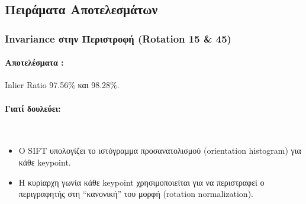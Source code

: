 \documentclass[12pt]{article}
\begin{document}
\subsection{Πειράματα Αποτελεσμάτων}
\begin{table}[h!]
  \centering
  \caption{Αποτελέσματα δοκιμών αντιστοίχισης keypoints με RANSAC}
  \end{table}


\subsubsection{Invariance στην Περιστροφή (Rotation 15\textdegree{} \& 45\textdegree{})}  
\paragraph{Αποτελέσματα : }Inlier Ratio 97.56\% και 98.28\%.
\mbox{}\\
\paragraph{Γιατί δουλεύει:}
\mbox{}\\
\begin{itemize}
  \item Ο SIFT υπολογίζει το ιστόγραμμα προσανατολισμού (orientation histogram) για κάθε keypoint.
  \item Η κυρίαρχη γωνία κάθε keypoint χρησιμοποιείται για να περιστραφεί ο περιγραφητής στη “κανονική” του μορφή (rotation normalization).
\end{itemize}
\end{document}
